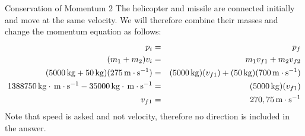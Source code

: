 \begin{wex}{Conservation of Momentum 2}
{
The helicopter and missile are connected initially and move at the same velocity. We will therefore combine their masses and change the momentum equation as follows:
\begin{eqnarray*}
p_{i}&=& p_{f}\\
(m_1 + m_2)v_{i} &=& m_1v_{f1} + m_2v_{f2}\\
(5000\,\mathrm{kg} + 50\,\mathrm{kg})(275 \,\mathrm{m \cdot s^{-1}}) &=& (5000 \,\mathrm{kg})(v_{f1}) + (50 \,\mathrm{kg})(700 \,\mathrm{m \cdot s^{-1}})\\
1388750\,\mathrm{kg}\cdot\,\mathrm{m \cdot s^{-1}} -35000\,\mathrm{kg}\cdot\,\mathrm{m \cdot s^{-1}} &=& (5000 \,\mathrm{kg})(v_{f1})\\
v_{f1} &=& 270,75 \,\mathrm{m \cdot s^{-1}}
\end{eqnarray*}
Note that speed is asked and not velocity, therefore no direction is included in the answer.
}
\end{wex}

